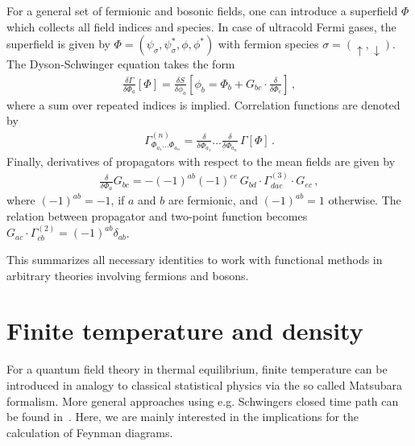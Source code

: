 For a general set of fermionic and bosonic fields, one can introduce a superfield $\Phi$ which collects all field indices and species. In case of ultracold Fermi gases, the superfield is given by $\Phi=(\psi_{\sigma},\psi_{\sigma}^*,\phi,\phi^*)$ with fermion species $\sigma=(\uparrow,\downarrow)$. The Dyson-Schwinger equation takes the form
%
\begin{align}
	\label{eq:DSE-general}
	\frac{\delta\Gamma}{\delta\Phi_a}\left[\Phi\right] = \frac{\delta S}{\delta\phi_a}\left[\phi_b=\Phi_b+G_{bc}\cdot\frac{\delta}{\delta\Phi_c}\right] \,,
\end{align}
%
where a sum over repeated indices is implied. Correlation functions are denoted by
%
\begin{align}
	\label{eq:super-correlation-functions}
	\Gamma^{(n)}_{\Phi_{a_1}\dots\Phi_{a_n}}=\frac{\delta}{\delta\Phi_{a_1}}\dots \frac{\delta}{\delta\Phi_{a_n}}\, \Gamma[\Phi] \,.
\end{align}
%
Finally, derivatives of propagators with respect to the mean fields are given by~\cite{Pawlowski2021}
%
\begin{align}
	\label{eq:derivative-propagator}
	\frac{\delta}{\delta\Phi_a} G_{bc} = -(-1)^{ab}(-1)^{ee} \, G_{bd}\cdot\Gamma^{(3)}_{dae}\cdot G_{ec} \,,
\end{align}
%
where $(-1)^{ab}=-1$, if $a$ and $b$ are fermionic, and $(-1)^{ab}=1$ otherwise. The relation between propagator and two-point function becomes $G_{ac}\cdot\Gamma^{(2)}_{cb}=(-1)^{ab}\delta_{ab}$.

This summarizes all necessary identities to work with functional methods in arbitrary theories involving fermions and bosons.

\section{Finite temperature and density}
\label{section:finite-temperature-density}

For a quantum field theory in thermal equilibrium, finite temperature can be introduced in analogy to classical statistical physics via the so called Matsubara formalism. More general approaches using e.g. Schwingers closed time path can be found in~\cite{LeBellac1996}. Here, we are mainly interested in the implications for the calculation of Feynman diagrams. 

